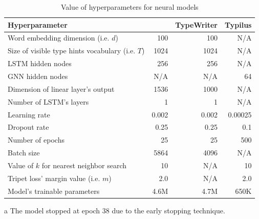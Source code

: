 \begin{table}[!t]
	\caption{Value of hyperparameters for neural models}
	\label{ch4:tab:hyperp}
	\begin{threeparttable}\begin{tabular}{@{}lrrr@{}}
				\toprule
				Hyperparameter &  \name & TypeWriter & Typilus \\
				\midrule
				Word embedding dimension (i.e. $d$) & 100 & 100 & N/A \\
				Size of visible type hints vocabulary (i.e. $T$) & 1024 & 1024 & N/A \\
				LSTM hidden nodes & 256 & 256 & N/A \\
				GNN hidden nodes & N/A & N/A & 64 \\
				Dimension of linear layer's output & 1536 & 1000 & N/A \\
				Number of LSTM's layers & 1 & 1 & N/A \\
				Learning rate & 0.002 & 0.002 & 0.00025 \\
				Dropout rate & 0.25 & 0.25 & 0.1 \\
				Number of epochs & 25 & 25 & 500\tnote{a} \\
				Batch size & 5864 & 4096 & N/A \\
				Value of $k$ for nearest neighbor search & 10 & N/A & 10 \\
				Tripet loss' margin value (i.e. $m$) & 2.0 & N/A & 2.0 \\
				\midrule
				Model's trainable parameters & 4.6M & 4.7M & 650K \\
				\bottomrule
			\end{tabular}
			\begin{tablenotes}
				\item[a] {\footnotesize The model stopped at epoch 38 due to the early stopping technique.}
			\end{tablenotes}
	\end{threeparttable}
\end{table}

